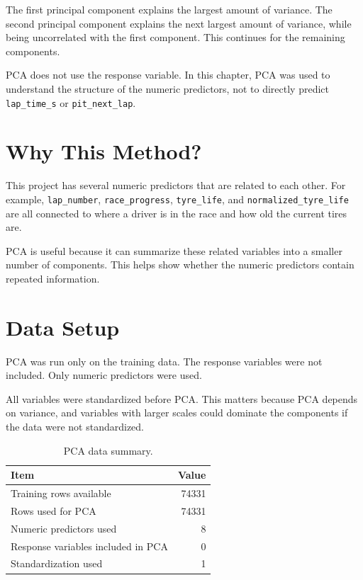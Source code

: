 \documentclass[11pt,oneside,openany]{book}
\begin{document}
The first principal component explains the largest amount of variance. The second principal component explains the next largest amount of variance, while being uncorrelated with the first component. This continues for the remaining components.

PCA does not use the response variable. In this chapter, PCA was used to understand the structure of the numeric predictors, not to directly predict \texttt{lap\_time\_s} or \texttt{pit\_next\_lap}.

\section{Why This Method?}

This project has several numeric predictors that are related to each other. For example, \texttt{lap\_number}, \texttt{race\_progress}, \texttt{tyre\_life}, and \texttt{normalized\_tyre\_life} are all connected to where a driver is in the race and how old the current tires are.

PCA is useful because it can summarize these related variables into a smaller number of components. This helps show whether the numeric predictors contain repeated information.

\section{Data Setup}

PCA was run only on the training data. The response variables were not included. Only numeric predictors were used.

All variables were standardized before PCA. This matters because PCA depends on variance, and variables with larger scales could dominate the components if the data were not standardized.

\begin{table}[H]
\centering
\small
\caption{PCA data summary.}
\begin{tabular}{lr}
\toprule
Item & Value\\
\midrule
Training rows available & 74331\\
Rows used for PCA & 74331\\
Numeric predictors used & 8\\
Response variables included in PCA & 0\\
Standardization used & 1\\
\bottomrule
\end{tabular}
\end{table}
\end{document}

